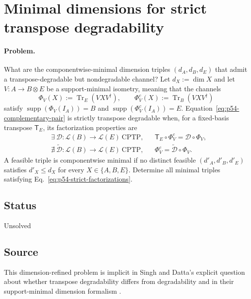 \section{Minimal dimensions for strict transpose degradability}
\label{sec:problem-54}

\paragraph{Problem.}
What are the componentwise-minimal dimension triples
$(d_A,d_B,d_E)$ that admit a transpose-degradable but nondegradable channel?
Let $d_X:=\dim X$ and let $V:A\to B\otimes E$ be a support-minimal isometry,
meaning that the channels
\begin{equation}
  \Phi_V(X):=\operatorname{Tr}_E(VXV^\dagger),
  \qquad
  \Phi_V^c(X):=\operatorname{Tr}_B(VXV^\dagger)
  \label{eq:p54-complementary-pair}
\end{equation}
satisfy
$\operatorname{supp}(\Phi_V(I_A))=B$ and
$\operatorname{supp}(\Phi_V^c(I_A))=E$.
Equation~\eqref{eq:p54-complementary-pair} is strictly transpose degradable
when, for a fixed-basis transpose $\mathsf T_E$, its factorization properties
are
\begin{equation}
  \begin{aligned}
    &\exists\ \mathcal D:\mathcal L(B)\to\mathcal L(E)\ \text{CPTP},
    &&\mathsf T_E\circ\Phi_V^c=\mathcal D\circ\Phi_V,\\
    &\nexists\ \widetilde{\mathcal D}:\mathcal L(B)\to\mathcal L(E)\
      \text{CPTP},
    &&\Phi_V^c=\widetilde{\mathcal D}\circ\Phi_V.
  \end{aligned}
  \label{eq:p54-strict-factorizations}
\end{equation}
A feasible triple is componentwise minimal if no distinct feasible
$(d'_A,d'_B,d'_E)$ satisfies $d'_X\leq d_X$ for every $X\in\{A,B,E\}$.
Determine all minimal triples satisfying
Eq.~\eqref{eq:p54-strict-factorizations}.

\subsection*{Status}

Unsolved

\subsection*{Source}

This dimension-refined problem is implicit in Singh and Datta's explicit
question about whether transpose degradability differs from degradability and
in their support-minimal dimension formalism
.

